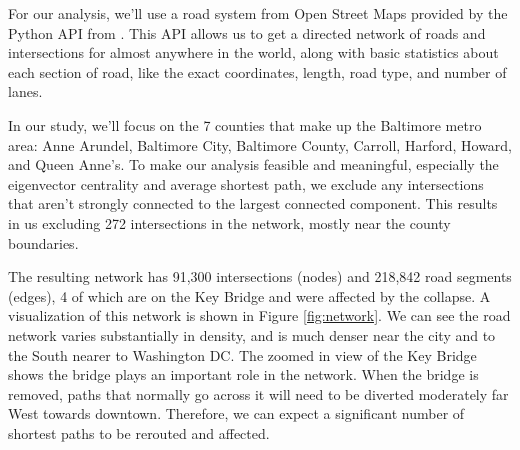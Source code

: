 \documentclass[11pt]{article}
\numberwithin{equation}{section} %
\numberwithin{figure}{section} %
\numberwithin{table}{section} %
\theoremstyle{definition}
\begin{document}
For our analysis, we'll use a road system from Open Street Maps provided by the Python API from \cite{Boeing17}. This API allows us to get a directed network of roads and intersections for almost anywhere in the world, along with basic statistics about each section of road, like the exact coordinates, length, road type, and number of lanes. 

In our study, we'll focus on the 7 counties that make up the Baltimore metro area: Anne Arundel, Baltimore City, Baltimore County, Carroll, Harford, Howard, and Queen Anne's. To make our analysis feasible and meaningful, especially the eigenvector centrality and average shortest path, we exclude any intersections that aren't strongly connected to the largest connected component. This results in us excluding 272 intersections in the network, mostly near the county boundaries.

The resulting network has 91,300 intersections (nodes) and 218,842 road segments (edges), 4 of which are on the Key Bridge and were affected by the collapse. A visualization of this network is shown in Figure \ref{fig:network}. We can see the road network varies substantially in density, and is much denser near the city and to the South nearer to Washington DC. The zoomed in view of the Key Bridge shows the bridge plays an important role in the network. When the bridge is removed, paths that normally go across it will need to be diverted moderately far West towards downtown. Therefore, we can expect a significant number of shortest paths to be rerouted and affected.
\end{document}
